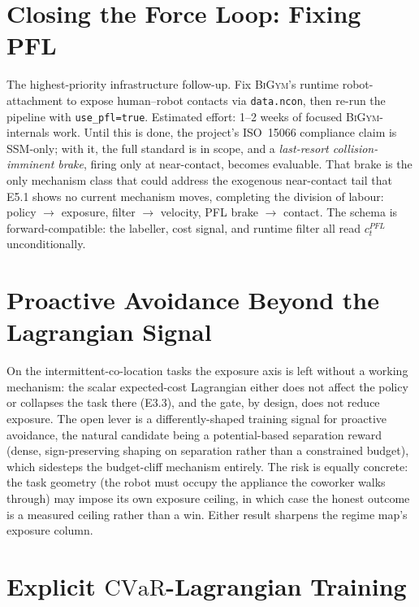 \documentclass[11pt,a4paper]{report}
\newcommand{\ssm}{SSM}
\newcommand{\pfl}{PFL}
\newcommand{\iso}{ISO~15066}
\newcommand{\cvar}{\ensuremath{\mathrm{CVaR}}}
\newcommand{\bigym}{\textsc{BiGym}}
\begin{document}
\section{Closing the Force Loop: Fixing \pfl{}}
\label{sec:fw:pfl}

The highest-priority infrastructure follow-up. Fix \bigym{}'s runtime
robot-attachment to expose human--robot contacts via
\texttt{data.ncon}, then re-run the pipeline with
\texttt{use\_pfl=true}. Estimated effort: 1--2 weeks of focused
\bigym{}-internals work. Until this is done, the project's \iso{}
compliance claim is \ssm{}-only; with it, the full standard is in
scope, and a \emph{last-resort collision-imminent brake}, firing only
at near-contact, becomes evaluable. That brake is the only mechanism
class that could address the exogenous near-contact tail that E5.1
shows no current mechanism moves, completing the division of labour:
policy $\to$ exposure, filter $\to$ velocity, \pfl{} brake $\to$
contact. The schema is forward-compatible: the labeller, cost signal,
and runtime filter all read $c^{\pfl}_t$ unconditionally.

\section{Proactive Avoidance Beyond the Lagrangian Signal}
\label{sec:fw:proactive}

On the intermittent-co-location tasks the exposure axis is left
without a working mechanism: the scalar expected-cost Lagrangian either
does not affect the policy or collapses the task there (E3.3), and the
gate, by design, does not reduce exposure. The open lever is a
differently-shaped training signal for
proactive avoidance, the natural candidate being a potential-based
separation reward (dense, sign-preserving shaping on separation
rather than a constrained budget), which sidesteps the budget-cliff
mechanism entirely. The risk is equally concrete: the task geometry
(the robot must occupy the appliance the coworker walks through) may
impose its own exposure ceiling, in which case the honest outcome is
a measured ceiling rather than a win. Either result sharpens the
regime map's exposure column.

\section{Explicit \cvar{}-Lagrangian Training}
\label{sec:fw:cvar}
\end{document}
